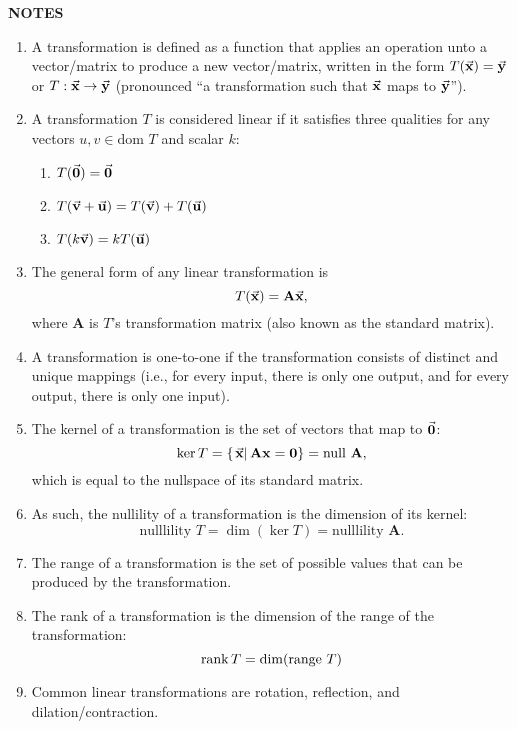 \documentclass[12pt]{article}
\newcommand{\mat}[1]{\mathbf{#1}}
\newcommand{\notes}{\textbf{NOTES}}
\newcommand{\nullsp}{\text{null }}
\newcommand{\nullility}{\text{nulllility }}
\newcommand{\set}[2]{\left\{\left.#1\right|#2\right\}}
\newcommand{\dom}{\text{dom }}
\newcommand{\range}{\text{range }}
\begin{document}
\notes 

\begin{enumerate}
\item A transformation is defined as a function that applies an operation unto a vector/matrix to produce a new vector/matrix, written in the form $T(\va{x}) = \va{y}$ or $T : \va{x} \to \va{y}$ (pronounced ``a transformation such that $\va{x}$ maps to $\va{y}$'').
\item A transformation $T$ is considered linear if it satisfies three qualities for any vectors $u, v \in \dom T$ and scalar $k$:
\begin{enumerate}
\item $T(\va{0}) = \va{0}$
\item $T(\va{v} + \va{u}) = T(\va{v}) + T(\va{u})$
\item $T(k\va{v}) = kT(\va{u})$
\end{enumerate} 
\item The general form of any linear transformation is
\begin{equation}
T(\va{x}) = \mat{A}\va{x},
\end{equation}
where $\mat{A}$ is $T$'s transformation matrix (also known as the standard matrix).
\item A transformation is one-to-one if the transformation consists of distinct and unique mappings (i.e., for every input, there is only one output, and for every output, there is only one input).
\item The kernel of a transformation is the set of vectors that map to $\va{0}$:
\begin{equation}
\ker T = \set{ \va{x} }{ \mat{Ax=0} } = \nullsp \mat{A}, 
\end{equation}
which is equal to the nullspace of its standard matrix.
\item As such, the nullility of a transformation is the dimension of its kernel:
\begin{equation}
\nullility T = \dim(\ker T) = \nullility \mat{A}.
\end{equation}
\item The range of a transformation is the set of possible values that can be produced by the transformation.
\item The rank of a transformation is the dimension of the range of the transformation:
\begin{equation}
\rank T = \dim(\range T)
\end{equation}
\item Common linear transformations are rotation, reflection, and dilation/contraction.

\end{enumerate}
\end{document}
